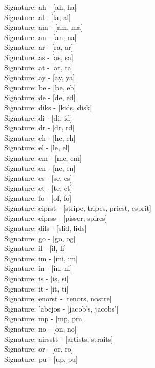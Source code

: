 Signature: {ah} - [ah, ha] \\
Signature: {al} - [la, al] \\
Signature: {am} - [am, ma] \\
Signature: {an} - [an, na] \\
Signature: {ar} - [ra, ar] \\
Signature: {as} - [as, sa] \\
Signature: {at} - [at, ta] \\
Signature: {ay} - [ay, ya] \\
Signature: {be} - [be, eb] \\
Signature: {de} - [de, ed] \\
Signature: {diks} - [kids, disk] \\
Signature: {di} - [di, id] \\
Signature: {dr} - [dr, rd] \\
Signature: {eh} - [he, eh] \\
Signature: {el} - [le, el] \\
Signature: {em} - [me, em] \\
Signature: {en} - [ne, en] \\
Signature: {es} - [se, es] \\
Signature: {et} - [te, et] \\
Signature: {fo} - [of, fo] \\
Signature: {eiprst} - [stripe, tripes, priest, esprit] \\
Signature: {eiprss} - [pisser, spires] \\
Signature: {dils} - [slid, lids] \\
Signature: {go} - [go, og] \\
Signature: {il} - [il, li] \\
Signature: {im} - [mi, im] \\
Signature: {in} - [in, ni] \\
Signature: {is} - [is, si] \\
Signature: {it} - [it, ti] \\
Signature: {enorst} - [tenors, nostre] \\
Signature: {'abcjos} - [jacob's, jacobs'] \\
Signature: {mp} - [mp, pm] \\
Signature: {no} - [on, no] \\
Signature: {airsstt} - [artists, straits] \\
Signature: {or} - [or, ro] \\
Signature: {pu} - [up, pu] \\
